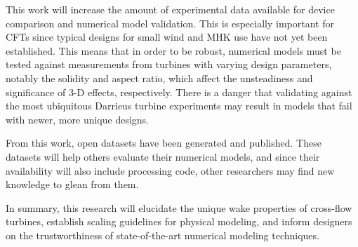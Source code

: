 This work will increase the amount of experimental data available for device
comparison and numerical model validation. This is especially important for CFTs
since typical designs for small wind and MHK use have not yet been established.
This means that in order to be robust, numerical models must be tested against
measurements from turbines with varying design parameters, notably the solidity
and aspect ratio, which affect the unsteadiness and significance of 3-D effects,
respectively. There is a danger that validating against the most ubiquitous
Darrieus turbine experiments may result in models that fail with newer, more
unique designs.

From this work, open datasets have been generated and published. These datasets
will help others evaluate their numerical models, and since their availability
will also include processing code, other researchers may find new knowledge to
glean from them. 

In summary, this research will elucidate the unique wake properties of
cross-flow turbines, establish scaling guidelines for physical modeling, and
inform designers on the trustworthiness of state-of-the-art numerical modeling
techniques.
